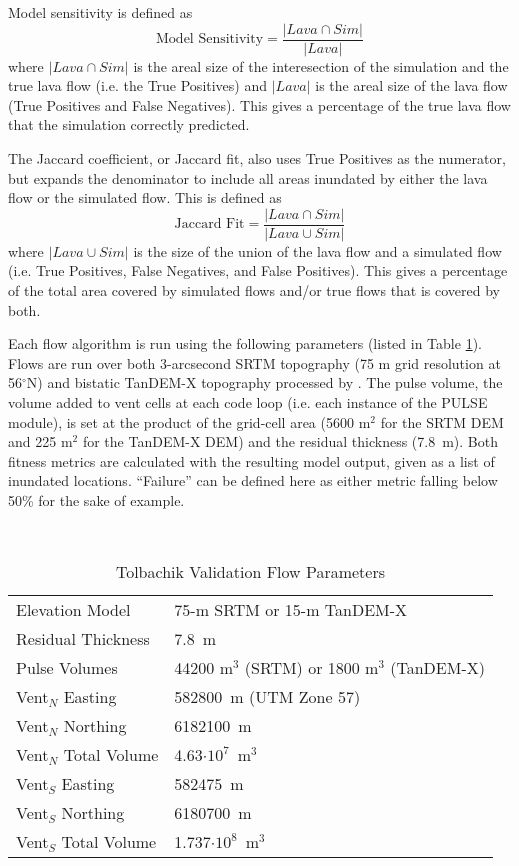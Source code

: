 		Model sensitivity is defined as
		\begin{equation}
			\text{Model~Sensitivity}=\frac{|Lava\cap Sim|}{|Lava|}
		\label{eq_sensitivity}
		\end{equation}
		where $|Lava\cap Sim|$ is the areal size of the interesection of the simulation and the true lava flow (i.e. the True Positives) and $|Lava|$ is the areal size of the lava flow (True Positives and False Negatives). This gives a percentage of the true lava flow that the simulation correctly predicted. 
		
		The Jaccard coefficient, or Jaccard fit, also uses True Positives as the numerator, but expands the denominator to include all areas inundated by either the lava flow or the simulated flow. This is defined as 
		\begin{equation}
			\text{Jaccard~Fit}=\frac{|Lava\cap Sim|}{|Lava\cup Sim|}
		\end{equation}
		where $|Lava\cup Sim|$ is the size of the union of the lava flow and a simulated flow (i.e. True Positives, False Negatives, and False Positives). This gives a percentage of the total area covered by simulated flows and/or true flows that is covered by both.
		
		Each flow algorithm is run using the following parameters (listed in Table \ref{tab_tolbflowparameters}). Flows are run over both 3-arcsecond SRTM topography (75 m grid resolution at 56$^{\circ}$N) and bistatic TanDEM-X topography processed by \citet{kubanek2015lava}. The pulse volume, the volume added to vent cells at each code loop (i.e. each instance of the PULSE module), is set at the product of the grid-cell area (5600 m$^2$ for the SRTM DEM and 225 m$^2$ for the TanDEM-X DEM) and the residual thickness (7.8~m). Both fitness metrics are calculated with the resulting model output, given as a list of inundated locations. ``Failure'' can be defined here as either metric falling below 50\% for the sake of example.
		
		\begin{table}[h]
			\centering
			\caption{Tolbachik Validation Flow Parameters}\\
			\begin{tabular}{l l}
				\toprule
				Elevation Model & 75-m SRTM or 15-m TanDEM-X\\
				Residual Thickness & 7.8~m\\
				Pulse Volumes & 44200 m$^3$ (SRTM) or 1800 m$^3$ (TanDEM-X)\\
				\midrule
				Vent$_N$ Easting & 582800~m (UTM Zone 57)\\
				Vent$_N$ Northing & 6182100~m\\
				Vent$_N$ Total Volume & 4.63$\cdot10^7$~m$^3$\\
				\midrule
				Vent$_S$ Easting & 582475~m\\
				Vent$_S$ Northing & 6180700~m\\
				Vent$_S$ Total Volume & 1.737$\cdot10^8$~m$^3$\\
				\bottomrule
			\end{tabular}
			\label{tab_tolbflowparameters}
		\end{table}
			
